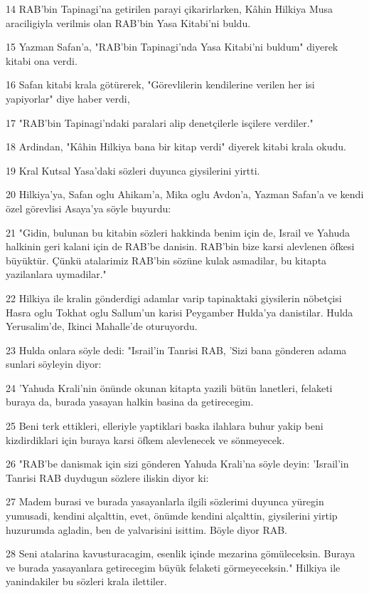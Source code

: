 \par 14 RAB'bin Tapinagi'na getirilen parayi çikarirlarken, Kâhin Hilkiya Musa araciligiyla verilmis olan RAB'bin Yasa Kitabi'ni buldu.
\par 15 Yazman Safan'a, "RAB'bin Tapinagi'nda Yasa Kitabi'ni buldum" diyerek kitabi ona verdi.
\par 16 Safan kitabi krala götürerek, "Görevlilerin kendilerine verilen her isi yapiyorlar" diye haber verdi,
\par 17 "RAB'bin Tapinagi'ndaki paralari alip denetçilerle isçilere verdiler."
\par 18 Ardindan, "Kâhin Hilkiya bana bir kitap verdi" diyerek kitabi krala okudu.
\par 19 Kral Kutsal Yasa'daki sözleri duyunca giysilerini yirtti.
\par 20 Hilkiya'ya, Safan oglu Ahikam'a, Mika oglu Avdon'a, Yazman Safan'a ve kendi özel görevlisi Asaya'ya söyle buyurdu:
\par 21 "Gidin, bulunan bu kitabin sözleri hakkinda benim için de, Israil ve Yahuda halkinin geri kalani için de RAB'be danisin. RAB'bin bize karsi alevlenen öfkesi büyüktür. Çünkü atalarimiz RAB'bin sözüne kulak asmadilar, bu kitapta yazilanlara uymadilar."
\par 22 Hilkiya ile kralin gönderdigi adamlar varip tapinaktaki giysilerin nöbetçisi Hasra oglu Tokhat oglu Sallum'un karisi Peygamber Hulda'ya danistilar. Hulda Yerusalim'de, Ikinci Mahalle'de oturuyordu.
\par 23 Hulda onlara söyle dedi: "Israil'in Tanrisi RAB, 'Sizi bana gönderen adama sunlari söyleyin diyor:
\par 24 'Yahuda Krali'nin önünde okunan kitapta yazili bütün lanetleri, felaketi buraya da, burada yasayan halkin basina da getirecegim.
\par 25 Beni terk ettikleri, elleriyle yaptiklari baska ilahlara buhur yakip beni kizdirdiklari için buraya karsi öfkem alevlenecek ve sönmeyecek.
\par 26 "RAB'be danismak için sizi gönderen Yahuda Krali'na söyle deyin: 'Israil'in Tanrisi RAB duydugun sözlere iliskin diyor ki:
\par 27 Madem burasi ve burada yasayanlarla ilgili sözlerimi duyunca yüregin yumusadi, kendini alçalttin, evet, önümde kendini alçalttin, giysilerini yirtip huzurumda agladin, ben de yalvarisini isittim. Böyle diyor RAB.
\par 28 Seni atalarina kavusturacagim, esenlik içinde mezarina gömüleceksin. Buraya ve burada yasayanlara getirecegim büyük felaketi görmeyeceksin." Hilkiya ile yanindakiler bu sözleri krala ilettiler.
